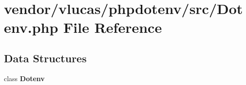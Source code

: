 \section{vendor/vlucas/phpdotenv/src/\+Dotenv.php File Reference}
\label{src_2_dotenv_8php}
\subsection*{Data Structures}
\begin{DoxyCompactItemize}
\item 
class {\bf Dotenv}
\end{DoxyCompactItemize}
